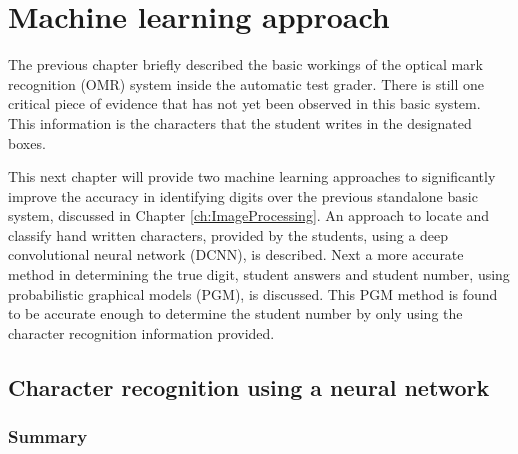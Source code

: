 \chapter{Machine learning approach}
\label{ch:MachineLearning}
\graphicspath{{Chapter4/Chapter4Figures/}}
The previous chapter briefly described the basic workings of the optical mark recognition (OMR) system inside the automatic test grader. There is still one critical piece of evidence that has not yet been observed in this basic system. This information is the characters that the student writes in the designated boxes.

This next chapter will provide two machine learning approaches to significantly improve the accuracy in identifying digits over the previous standalone basic system, discussed in Chapter \ref{ch:ImageProcessing}. An approach to locate and classify hand written characters, provided by the students, using a deep convolutional neural network (DCNN), is described. Next a more accurate method in determining the true digit, student answers and student number, using probabilistic  graphical models (PGM), is discussed. This PGM method is found to be accurate enough to determine the student number by only using the character recognition information provided.

\section{Character recognition using a neural network}

\subsection{Summary}

